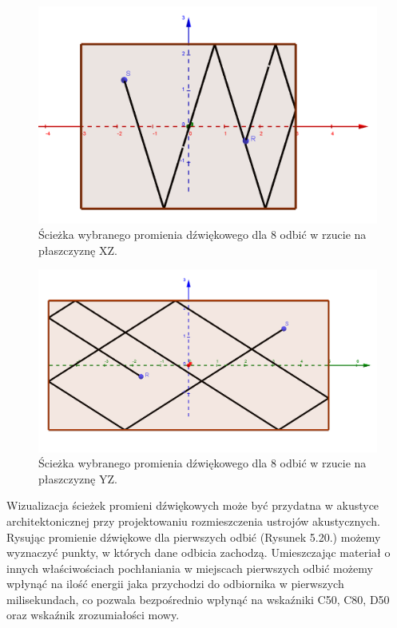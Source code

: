 \begin{figure}[h]
        \centering
                \centering
                \includegraphics[width=12cm]{odbiciay}
	\caption{Ścieżka wybranego promienia dźwiękowego dla 8 odbić w rzucie na płaszczyznę XZ.}
\end{figure}

\begin{figure}[h]
        \centering
                \centering
                \includegraphics[width=12cm]{odbiciax}
	\caption{Ścieżka wybranego promienia dźwiękowego dla 8 odbić w rzucie na płaszczyznę YZ.}
\end{figure}

Wizualizacja ścieżek promieni dźwiękowych może być przydatna w akustyce architektonicznej przy projektowaniu rozmieszczenia ustrojów akustycznych. Rysując promienie dźwiękowe dla pierwszych odbić (Rysunek 5.20.) możemy wyznaczyć punkty, w których dane odbicia zachodzą. Umieszczając materiał o innych właściwościach pochłaniania w miejscach pierwszych odbić możemy wpłynąć na ilość energii jaka przychodzi do odbiornika w pierwszych milisekundach, co pozwala bezpośrednio wpłynąć na wskaźniki C50, C80, D50 oraz wskaźnik zrozumiałości mowy.

